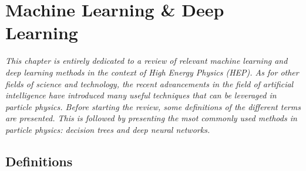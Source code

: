 \chapter{\color{oxfordblue} Machine Learning \& Deep Learning}
\ChapFrame

\textit{
This chapter is entirely dedicated to a review of relevant machine learning and deep learning methods in the context of High Energy Physics (HEP). As for other fields of science and technology, the recent advancements in the field of artificial intelligence have introduced many useful techniques that can be leveraged in particle physics. Before starting the review, some definitions of the different terms are presented. This is followed by presenting the msot commonly used methods in particle physics: decision trees and deep neural networks.
}

\section{Definitions}
